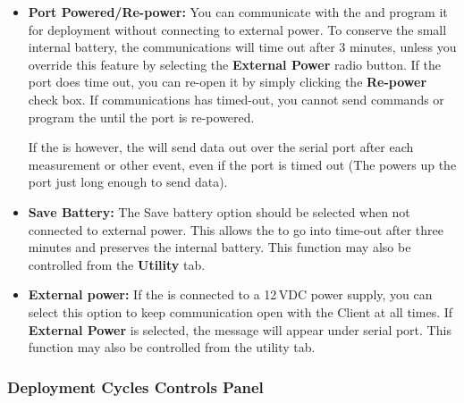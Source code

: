 \begin{itemize}
    \item[] \textbf{Port Powered/Re-power:}
    You can communicate with the \instType{} and program it for deployment without connecting to external power.  To conserve the small internal battery, the  communications will time out after 3 minutes, unless you override this feature by selecting the \textbf{External Power} radio button. If the port does time out, you can re-open it by simply clicking the \textbf{Re-power} check box. If communications has timed-out, you cannot send commands or program the \instType{} until the port is re-powered.
    
    If the \instType{} is \ifcase {}  \fi however, the  will send data out over the serial port after each measurement or other event, even if the port is timed out (The \instType{} powers up the port just long enough to send data).
    
    \item[] \textbf{Save Battery:}
    The Save battery option should be selected when not connected to external power. This allows the \instType{} to go into time-out after three minutes and preserves the internal battery. This function may also be controlled from the \textbf{Utility} tab.
    
    \item[] \textbf{External power:}
    If the \instType{} is connected to a 12\,VDC power supply, you can select this option to keep communication open with the \instType{} Client at all times. If \textbf{External Power} is selected, the message  will appear under serial port. This function may also be controlled from the utility tab.
\end{itemize}


\subsubsection{Deployment Cycles Controls Panel} 

